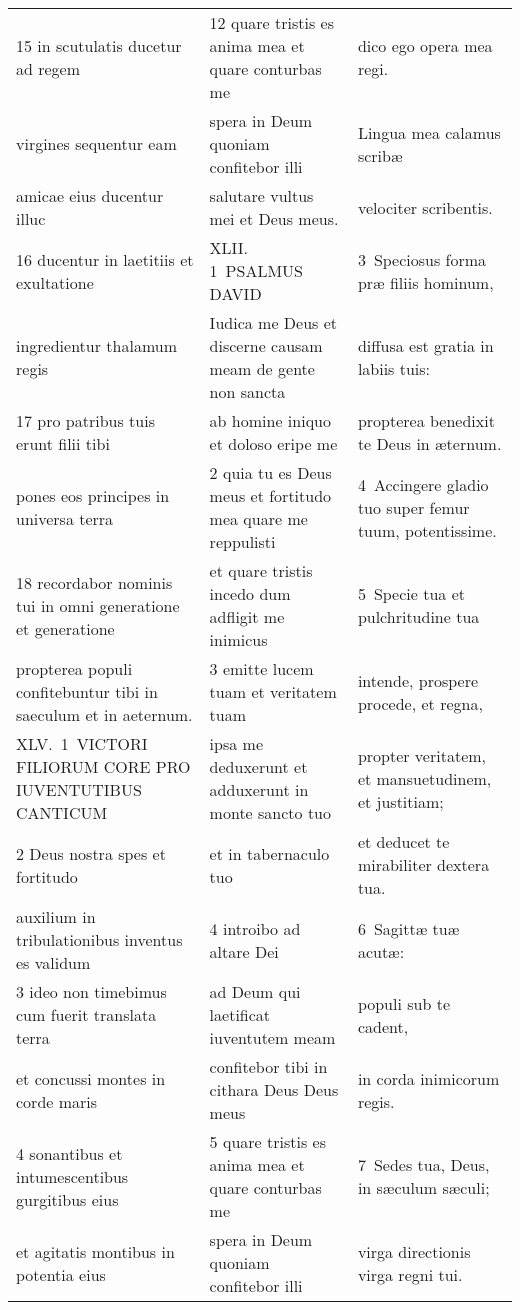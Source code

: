 \documentclass{article}
\begin{document}
\begin{longtable}{@{}p{}p{}p{}@{}}
15 in scutulatis ducetur ad regem	&	12 quare tristis es anima mea et quare conturbas me	&	dico ego opera mea regi.	\\
virgines sequentur eam	&	spera in Deum quoniam confitebor illi	&	Lingua mea calamus scribæ	\\
amicae eius ducentur illuc	&	salutare vultus mei et Deus meus.	&	velociter scribentis.	\\
16 ducentur in laetitiis et exultatione	&	XLII. 1 PSALMUS DAVID	&	3 Speciosus forma præ filiis hominum,	\\
ingredientur thalamum regis	&	Iudica me Deus et discerne causam meam de gente non sancta	&	diffusa est gratia in labiis tuis:	\\
17 pro patribus tuis erunt filii tibi	&	ab homine iniquo et doloso eripe me	&	propterea benedixit te Deus in æternum.	\\
pones eos principes in universa terra	&	2 quia tu es Deus meus et fortitudo mea quare me reppulisti	&	4 Accingere gladio tuo super femur tuum, potentissime.	\\
18 recordabor nominis tui in omni generatione et generatione	&	et quare tristis incedo dum adfligit me inimicus	&	5 Specie tua et pulchritudine tua	\\
propterea populi confitebuntur tibi in saeculum et in aeternum.	&	3 emitte lucem tuam et veritatem tuam	&	intende, prospere procede, et regna,	\\
XLV. 1 VICTORI FILIORUM CORE PRO IUVENTUTIBUS CANTICUM	&	ipsa me deduxerunt et adduxerunt in monte sancto tuo	&	propter veritatem, et mansuetudinem, et justitiam;	\\
2 Deus nostra spes et fortitudo	&	et in tabernaculo tuo	&	et deducet te mirabiliter dextera tua.	\\
auxilium in tribulationibus inventus es validum	&	4 introibo ad altare Dei	&	6 Sagittæ tuæ acutæ:	\\
3 ideo non timebimus cum fuerit translata terra	&	ad Deum qui laetificat iuventutem meam	&	populi sub te cadent,	\\
et concussi montes in corde maris	&	confitebor tibi in cithara Deus Deus meus	&	in corda inimicorum regis.	\\
4 sonantibus et intumescentibus gurgitibus eius	&	5 quare tristis es anima mea et quare conturbas me	&	7 Sedes tua, Deus, in sæculum sæculi;	\\
et agitatis montibus in potentia eius	&	spera in Deum quoniam confitebor illi	&	virga directionis virga regni tui.	\\

\end{longtable}
\end{document}
